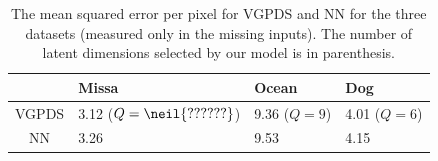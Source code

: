\documentclass{article} %
\begin{document}
\begin{table}[h]
\caption{
\small{
The mean squared error per pixel for VGPDS and NN for the three datasets (measured only in the missing inputs). The number of latent dimensions selected by our model is in parenthesis. 
} }
\label{videoResultsTable}
\begin{center}
\begin{tabular}{c||l|l|l}
  & Missa & Ocean & Dog \\
\hline \hline
VGPDS  & 3.12 ($Q =\neil{??????}$) & 9.36 ($Q = 9$)  & 4.01 ($Q = 6$) \\  \hline
NN  & 3.26 & 9.53 & 4.15 \\
\end{tabular}
\end{center}
\end{table}
\end{document}

